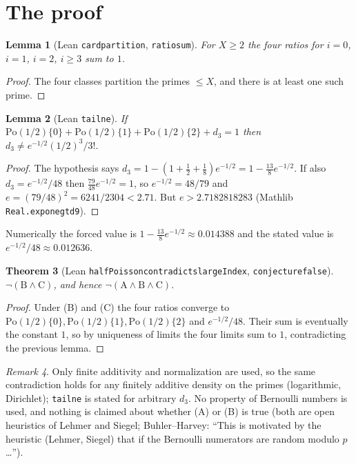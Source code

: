 \documentclass[11pt]{article}
\renewcommand{\_}{\oldus\allowbreak}
\newtheorem{theorem}{Theorem}
\newtheorem{lemma}[theorem]{Lemma}
\theoremstyle{definition}
\theoremstyle{remark}
\newtheorem{remark}[theorem]{Remark}
\begin{document}
\section{The proof}

\begin{lemma}[Lean \texttt{card\_partition}, \texttt{ratio\_sum}]
For $X \ge 2$ the four ratios for $i = 0$, $i = 1$, $i = 2$, $i \ge 3$ sum to $1$.
\end{lemma}
\begin{proof}
The four classes partition the primes $\le X$, and there is at least one such prime.
\end{proof}

\begin{lemma}[Lean \texttt{tail\_ne}]
If $\mathrm{Po}(1/2)\{0\} + \mathrm{Po}(1/2)\{1\} + \mathrm{Po}(1/2)\{2\} + d_3 = 1$ then
$d_3 \ne e^{-1/2}(1/2)^3/3!$.
\end{lemma}
\begin{proof}
The hypothesis says $d_3 = 1 - (1 + \tfrac12 + \tfrac18)e^{-1/2} = 1 - \tfrac{13}{8}e^{-1/2}$. If also
$d_3 = e^{-1/2}/48$ then $\tfrac{79}{48} e^{-1/2} = 1$, so $e^{-1/2} = 48/79$ and
$e = (79/48)^2 = 6241/2304 < 2.71$. But $e > 2.7182818283$ (Mathlib \texttt{Real.exp\_one\_gt\_d9}).
\end{proof}
Numerically the forced value is $1 - \tfrac{13}{8}e^{-1/2} \approx 0.014388$ and the stated value is
$e^{-1/2}/48 \approx 0.012636$.

\begin{theorem}[Lean \texttt{halfPoisson\_contradicts\_largeIndex}, \texttt{conjecture\_8189\_false}]
$\neg(\mathrm{B} \wedge \mathrm{C})$, and hence $\neg(\mathrm{A} \wedge \mathrm{B} \wedge \mathrm{C})$.
\end{theorem}
\begin{proof}
Under (B) and (C) the four ratios converge to $\mathrm{Po}(1/2)\{0\}, \mathrm{Po}(1/2)\{1\},
\mathrm{Po}(1/2)\{2\}$ and $e^{-1/2}/48$. Their sum is eventually the constant $1$, so by uniqueness of limits
the four limits sum to $1$, contradicting the previous lemma.
\end{proof}

\begin{remark}
Only finite additivity and normalization are used, so the same contradiction holds for any finitely
additive density on the primes (logarithmic, Dirichlet); \texttt{tail\_ne} is stated for arbitrary $d_3$.
No property of Bernoulli numbers is used, and nothing is claimed about whether (A) or (B) is true (both are
open heuristics of Lehmer and Siegel; Buhler--Harvey: ``This is motivated by the heuristic (Lehmer, Siegel)
that if the Bernoulli numerators are random modulo $p$ \dots'').
\end{remark}
\end{document}
